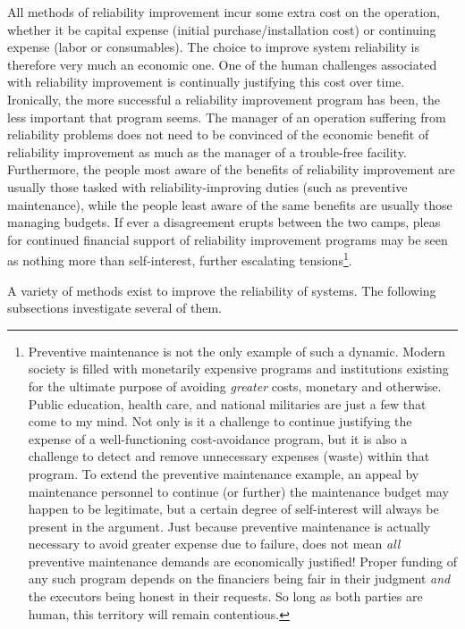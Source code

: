 All methods of reliability improvement incur some extra cost on the operation, whether it be capital expense (initial purchase/installation cost) or continuing expense (labor or consumables).  The choice to improve system reliability is therefore very much an economic one.  One of the human challenges associated with reliability improvement is continually justifying this cost over time.  Ironically, the more successful a reliability improvement program has been, the less important that program seems.  The manager of an operation suffering from reliability problems does not need to be convinced of the economic benefit of reliability improvement as much as the manager of a trouble-free facility.  Furthermore, the people most aware of the benefits of reliability improvement are usually those tasked with reliability-improving duties (such as preventive maintenance), while the people least aware of the same benefits are usually those managing budgets.  If ever a disagreement erupts between the two camps, pleas for continued financial support of reliability improvement programs may be seen as nothing more than self-interest, further escalating tensions\footnote{Preventive maintenance is not the only example of such a dynamic.  Modern society is filled with monetarily expensive programs and institutions existing for the ultimate purpose of avoiding \textit{greater} costs, monetary and otherwise.  Public education, health care, and national militaries are just a few that come to my mind.  Not only is it a challenge to continue justifying the expense of a well-functioning cost-avoidance program, but it is also a challenge to detect and remove unnecessary expenses (waste) within that program.  To extend the preventive maintenance example, an appeal by maintenance personnel to continue (or further) the maintenance budget may happen to be legitimate, but a certain degree of self-interest will always be present in the argument.  Just because preventive maintenance is actually necessary to avoid greater expense due to failure, does not mean \textit{all} preventive maintenance demands are economically justified!  Proper funding of any such program depends on the financiers being fair in their judgment \textit{and} the executors being honest in their requests.  So long as both parties are human, this territory will remain contentious.}.

A variety of methods exist to improve the reliability of systems.  The following subsections investigate several of them.







